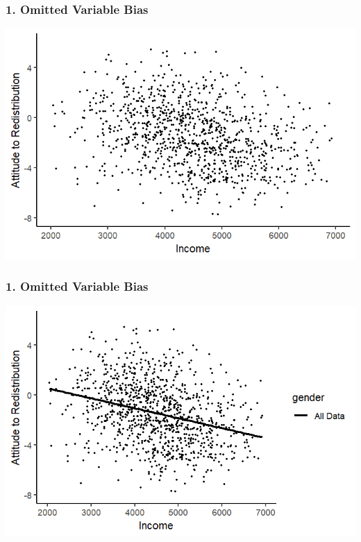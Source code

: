 \documentclass[xcolor=x11names,compress]{beamer}\usepackage[]{graphicx}\usepackage[]{color}
\makeatletter
\def\maxwidth{ %
  \ifdim\Gin@nat@width>\linewidth
    \linewidth
  \else
    \Gin@nat@width
  \fi
}
\newenvironment{knitrout}{}{} %
\renewcommand{\(}{\begin{columns}}
\renewcommand{\)}{\end{columns}}
\newcommand{\<}[1]{\begin{column}{#1}}
\renewcommand{\>}{\end{column}}
\makeatother
\begin{document}
\begin{frame}
\frametitle{1. Omitted Variable Bias}
\begin{knitrout}
\color{fgcolor}
\includegraphics[width=\maxwidth]{figure/confound3b-1} 

\end{knitrout}
\end{frame}

\begin{frame}
\frametitle{1. Omitted Variable Bias}
\begin{knitrout}
\color{fgcolor}
\includegraphics[width=\maxwidth]{figure/confound3c-1} 

\end{knitrout}
\end{frame}
\end{document}
